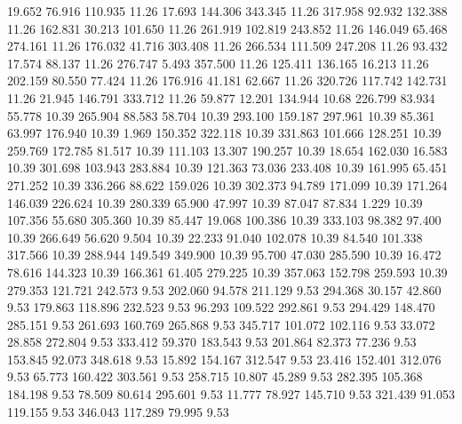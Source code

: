   19.652   76.916  110.935        11.26
  17.693  144.306  343.345        11.26
 317.958   92.932  132.388        11.26
 162.831   30.213  101.650        11.26
 261.919  102.819  243.852        11.26
 146.049   65.468  274.161        11.26
 176.032   41.716  303.408        11.26
 266.534  111.509  247.208        11.26
  93.432   17.574   88.137        11.26
 276.747    5.493  357.500        11.26
 125.411  136.165   16.213        11.26
 202.159   80.550   77.424        11.26
 176.916   41.181   62.667        11.26
 320.726  117.742  142.731        11.26
  21.945  146.791  333.712        11.26
  59.877   12.201  134.944        10.68
 226.799   83.934   55.778        10.39
 265.904   88.583   58.704        10.39
 293.100  159.187  297.961        10.39
  85.361   63.997  176.940        10.39
   1.969  150.352  322.118        10.39
 331.863  101.666  128.251        10.39
 259.769  172.785   81.517        10.39
 111.103   13.307  190.257        10.39
  18.654  162.030   16.583        10.39
 301.698  103.943  283.884        10.39
 121.363   73.036  233.408        10.39
 161.995   65.451  271.252        10.39
 336.266   88.622  159.026        10.39
 302.373   94.789  171.099        10.39
 171.264  146.039  226.624        10.39
 280.339   65.900   47.997        10.39
  87.047   87.834    1.229        10.39
 107.356   55.680  305.360        10.39
  85.447   19.068  100.386        10.39
 333.103   98.382   97.400        10.39
 266.649   56.620    9.504        10.39
  22.233   91.040  102.078        10.39
  84.540  101.338  317.566        10.39
 288.944  149.549  349.900        10.39
  95.700   47.030  285.590        10.39
  16.472   78.616  144.323        10.39
 166.361   61.405  279.225        10.39
 357.063  152.798  259.593        10.39
 279.353  121.721  242.573         9.53
 202.060   94.578  211.129         9.53
 294.368   30.157   42.860         9.53
 179.863  118.896  232.523         9.53
  96.293  109.522  292.861         9.53
 294.429  148.470  285.151         9.53
 261.693  160.769  265.868         9.53
 345.717  101.072  102.116         9.53
  33.072   28.858  272.804         9.53
 333.412   59.370  183.543         9.53
 201.864   82.373   77.236         9.53
 153.845   92.073  348.618         9.53
  15.892  154.167  312.547         9.53
  23.416  152.401  312.076         9.53
  65.773  160.422  303.561         9.53
 258.715   10.807   45.289         9.53
 282.395  105.368  184.198         9.53
  78.509   80.614  295.601         9.53
  11.777   78.927  145.710         9.53
 321.439   91.053  119.155         9.53
 346.043  117.289   79.995         9.53
